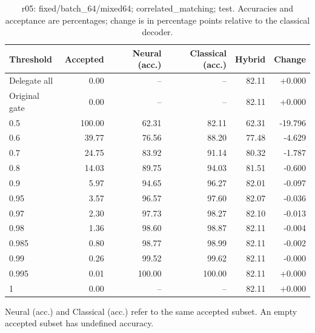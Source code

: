 \begin{table}[htbp]
\centering\small
\setlength{\tabcolsep}{3pt}
\caption{r05: fixed/batch\_64/mixed64; correlated\_matching; test. Accuracies and acceptance are percentages; change is in percentage points relative to the classical decoder.}
\begin{tabular}{lrrrrr}
\toprule
Threshold & Accepted & Neural (acc.) & Classical (acc.) & Hybrid & Change \\
\midrule
Delegate all & 0.00 & -- & -- & 82.11 & +0.000 \\
Original gate & 0.00 & -- & -- & 82.11 & +0.000 \\
0.5 & 100.00 & 62.31 & 82.11 & 62.31 & -19.796 \\
0.6 & 39.77 & 76.56 & 88.20 & 77.48 & -4.629 \\
0.7 & 24.75 & 83.92 & 91.14 & 80.32 & -1.787 \\
0.8 & 14.03 & 89.75 & 94.03 & 81.51 & -0.600 \\
0.9 & 5.97 & 94.65 & 96.27 & 82.01 & -0.097 \\
0.95 & 3.57 & 96.57 & 97.60 & 82.07 & -0.036 \\
0.97 & 2.30 & 97.73 & 98.27 & 82.10 & -0.013 \\
0.98 & 1.36 & 98.60 & 98.87 & 82.11 & -0.004 \\
0.985 & 0.80 & 98.77 & 98.99 & 82.11 & -0.002 \\
0.99 & 0.26 & 99.52 & 99.62 & 82.11 & -0.000 \\
0.995 & 0.01 & 100.00 & 100.00 & 82.11 & +0.000 \\
1 & 0.00 & -- & -- & 82.11 & +0.000 \\
\bottomrule
\end{tabular}
\par\smallskip\footnotesize Neural (acc.) and Classical (acc.) refer to the same accepted subset. An empty accepted subset has undefined accuracy.
\end{table}
